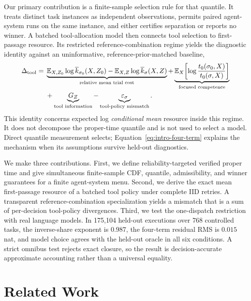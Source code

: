 Our primary contribution is a finite-sample selection rule for that quantile.
It treats distinct task instances as independent observations, permits paired
agent-system runs on the same instance, and either certifies separation or
reports no winner.  A batched tool-allocation model
then connects tool selection to first-passage resource.  Its restricted
reference-combination regime yields the diagnostic identity against an
uninformative, reference-prior-matched baseline,
\begin{equation}
\begin{aligned}
\Delta_{\mathrm{tool}}
={}&\underbrace{\mathbb{E}_{X,Z_0}\log\overline k_{\sigma_0}(X,Z_0)
-\mathbb{E}_{X,Z}\log\overline k_\sigma(X,Z)}_{\text{relative mean trial cost}}
+\underbrace{\mathbb{E}_X\!\left[\log
  \frac{t_0(\sigma_0,X)}{t_0(\sigma,X)}\right]}_{\text{focused competence}}\\[-0.15em]
&+\underbrace{G_Z}_{\text{tool information}}
-\underbrace{\varepsilon_\sigma}_{\text{tool-policy mismatch}}.
\label{eq:intro-four-term}
\end{aligned}
\end{equation}
This identity concerns expected log \emph{conditional mean} resource inside
this regime.  It does not decompose the proper-time quantile and is not used to select
a model.  Direct quantile measurement selects; Equation~\eqref{eq:intro-four-term}
explains the mechanism when its assumptions survive held-out diagnostics.

We make three contributions.  First, we define reliability-targeted verified
proper time and give simultaneous finite-sample CDF, quantile, admissibility,
and winner guarantees for a finite agent-system menu.
Second, we derive the exact mean first-passage resource of a batched tool
policy under complete IID retries.  A transparent reference-combination
specialization yields a mismatch that is a sum of per-decision tool-policy
divergences.  Third, we test the one-dispatch restriction with
real language models.  In 175,104 held-out executions over 768 controlled
tasks, the inverse-share exponent is \(0.987\), the four-term residual RMS is
\(0.015\) nat, and model choice agrees with the held-out oracle in all six conditions.
A strict omnibus test rejects exact closure, so the result is
decision-accurate approximate accounting rather than a universal equality.

\section{Related Work}
\label{sec:related}

